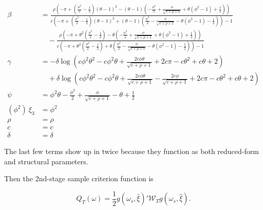 \documentclass[11pt, letterpaper, twoside, final]{article}
\newcommand*{\W}{\mathcal{W}}
\begin{document}
\begin{align}
    \beta &= \frac{\rho \left(- \pi + \left(\frac{\phi^{2}}{2} - \frac{1}{2}\right) \left(\theta -
        1\right)^{2} - \left(\theta - 1\right) \left(- \frac{\phi^{2}}{2} + \frac{\phi}{\sqrt{c + \rho + 1}} +
        \theta \left(\phi^{2} - 1\right) + \frac{1}{2}\right)\right)}{c \left(- \pi + \left(\frac{\phi^{2}}{2} -
        \frac{1}{2}\right) \left(\theta - 1\right)^{2} + \left(\theta - 1\right) \left(\frac{\phi^{2}}{2} -
        \frac{\phi}{\sqrt{c + \rho + 1}} - \theta \left(\phi^{2} - 1\right) - \frac{1}{2}\right)\right) - 1}
        \nonumber \\
% 
    &\quad- \frac{\rho \left(- \pi + \theta^{2} \left(\frac{\phi^{2}}{2} - \frac{1}{2}\right) - \theta \left(-
      \frac{\phi^{2}}{2} + \frac{\phi}{\sqrt{c + \rho + 1}} + \theta \left(\phi^{2} - 1\right) +
      \frac{1}{2}\right)\right)}{c \left(- \pi + \theta^{2} \left(\frac{\phi^{2}}{2} - \frac{1}{2}\right) + \theta
      \left(\frac{\phi^{2}}{2} - \frac{\phi}{\sqrt{c + \rho + 1}} - \theta \left(\phi^{2} - 1\right) -
      \frac{1}{2}\right)\right) - 1} \\
%
      \gamma &= - \delta \log{\left (c \phi^{2} \theta^{2} - c \phi^{2} \theta + \frac{2 c \phi
        \theta}{\sqrt{c + \rho + 1}} + 2 c \pi - c \theta^{2} + c \theta + 2 \right)}  \nonumber \\
%
      &\quad + \delta \log{\left (c \phi^{2} \theta^{2} - c \phi^{2} \theta + \frac{2 c \phi \theta}{\sqrt{c +
        \rho + 1}} - \frac{2 c \phi}{\sqrt{c + \rho + 1}} + 2 c \pi - c \theta^{2} + c \theta + 2 \right)} \\
%
      \psi &= \phi^{2} \theta - \frac{\phi^{2}}{2} + \frac{\phi}{\sqrt{c + \rho + 1}} - \theta +
      \frac{1}{2} \\
%
      (\phi^2)\ \xi_3 &= \phi^2  \\
%
      \rho &= \rho \\
%
      c &= c \\
%
     \delta  &= \delta 
%
\end{align}

The last few terms show up in twice because they function as both reduced-form and structural parameters. 

Then the 2nd-stage sample criterion function is 

\begin{equation}
    Q_T(\omega) = \frac{1}{2} g\left(\omega_s, \widehat{\xi}\right)' \W_{T} g\left(\omega_s, \widehat{\xi}\right).
\end{equation}
\end{document}
